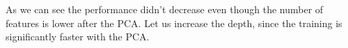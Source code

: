 \documentclass[11pt]{article}
\begin{document}
    \begin{center}
    \end{center}
    { \hspace*{\fill} \\}
    
    \begin{center}
    \end{center}
    { \hspace*{\fill} \\}
    
    As we can see the performance didn't decrease even though the number of
features is lower after the PCA. Let us increase the depth, since the
training is significantly faster with the PCA.
\end{document}
